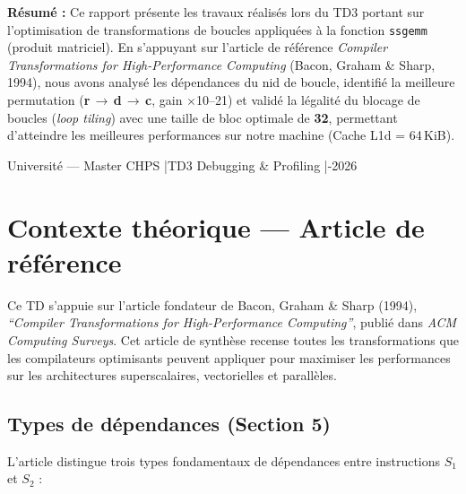 \documentclass[a4paper,11pt]{article}
\newcommand{\code}[1]{\texttt{\color{CodeRed}#1}}
\begin{document}
\begin{center}
\begin{tcolorbox}[
  width=0.88\linewidth,
  colback=BlueLight, colframe=BlueMid,
  arc=3pt, boxrule=0.6pt,
  left=12pt, right=12pt, top=8pt, bottom=8pt,
]
  \small\color{DarkGray}
  \textbf{R\'esum\'e :} Ce rapport pr\'esente les travaux r\'ealis\'es lors du TD3 portant
  sur l'optimisation de transformations de boucles appliqu\'ees \`a la fonction
  \code{ssgemm} (produit matriciel). En s'appuyant sur l'article de r\'ef\'erence
  \textit{Compiler Transformations for High-Performance Computing} (Bacon, Graham \&
  Sharp, 1994), nous avons analys\'e les d\'ependances du nid de boucle, identifi\'e la
  meilleure permutation (\textbf{r\,$\to$\,d\,$\to$\,c}, gain $\times$10--21) et valid\'e
  la l\'egalit\'e du blocage de boucles (\textit{loop tiling}) avec une taille de bloc
  optimale de \textbf{32}, permettant d'atteindre les meilleures performances sur notre
  machine (Cache L1d = 64\,KiB).
\end{tcolorbox}
\end{center}

\vfill

{\color{white}\small\centering
  Universit\'e --- Master CHPS \quad|\quad TD3 Debugging \& Profiling \quad|-2026
}

\newpage
\tableofcontents
\newpage

\section{Contexte th\'eorique --- Article de r\'ef\'erence}

Ce TD s'appuie sur l'article fondateur de Bacon, Graham \& Sharp (1994),
\textit{``Compiler Transformations for High-Performance Computing''}, publi\'e dans
\textit{ACM Computing Surveys}. Cet article de synth\`ese recense toutes les
transformations que les compilateurs optimisants peuvent appliquer pour maximiser
les performances sur les architectures superscalaires, vectorielles et parall\`eles.

\subsection{Types de d\'ependances (Section 5)}

L'article distingue trois types fondamentaux de d\'ependances entre instructions
$S_1$ et $S_2$ :
\end{document}
